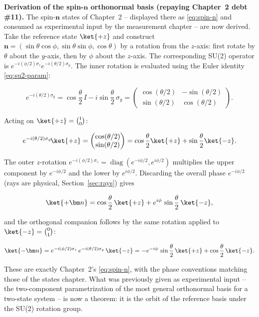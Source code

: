 \medskip\noindent\textbf{Derivation of the spin-$\bm n$ orthonormal basis (repaying Chapter~2 debt \#11).}
The spin-$\bm n$ states of Chapter~2 -- displayed there as \eqref{eq:spin-n} and consumed as experimental input by the measurement chapter -- are now derived. Take the reference state $\ket{+z}$ and construct $\bm n = (\sin\theta\cos\phi,\sin\theta\sin\phi,\cos\theta)$ by a rotation from the $z$-axis: first rotate by $\theta$ about the $y$-axis, then by $\phi$ about the $z$-axis. The corresponding SU(2) operator is $e^{-i(\phi/2)\sigma_z}e^{-i(\theta/2)\sigma_y}$. The inner rotation is evaluated using the Euler identity \eqref{eq:su2-param}:
\begin{linenomath}
  \begin{equation*}
    e^{-i(\theta/2)\sigma_y}
    = \cos\frac{\theta}{2}\,I - i\sin\frac{\theta}{2}\,\sigma_y
    = \begin{pmatrix}
        \cos(\theta/2) & -\sin(\theta/2) \\[2pt]
        \sin(\theta/2) &  \cos(\theta/2)
      \end{pmatrix}.
  \end{equation*}
\end{linenomath}
Acting on $\ket{+z} = \binom{1}{0}$:
\begin{linenomath}
  \begin{equation*}
    e^{-i(\theta/2)\sigma_y}\!\ket{+z}
    = \begin{pmatrix} \cos(\theta/2) \\ \sin(\theta/2) \end{pmatrix}
    = \cos\frac{\theta}{2}\ket{+z} + \sin\frac{\theta}{2}\ket{-z}.
  \end{equation*}
\end{linenomath}
The outer $z$-rotation $e^{-i(\phi/2)\sigma_z} = \operatorname{diag}(e^{-i\phi/2}, e^{i\phi/2})$ multiplies the upper component by $e^{-i\phi/2}$ and the lower by $e^{i\phi/2}$. Discarding the overall phase $e^{-i\phi/2}$ (rays are physical, Section~\ref{sec:rays}) gives
\begin{linenomath}
  \begin{equation}
    \ket{+\bm n} = \cos\frac{\theta}{2}\,\ket{+z} + e^{i\phi}\,\sin\frac{\theta}{2}\,\ket{-z},
    \label{eq:spin-n-derived}
  \end{equation}
\end{linenomath}
and the orthogonal companion follows by the same rotation applied to $\ket{-z}=\binom{0}{1}$:
\begin{linenomath}
  \begin{equation}
    \ket{-\bm n} = e^{-i(\phi/2)\sigma_z}\,e^{-i(\theta/2)\sigma_y}\,\ket{-z}
    = -e^{-i\phi}\,\sin\frac{\theta}{2}\,\ket{+z} + \cos\frac{\theta}{2}\,\ket{-z}.
  \end{equation}
\end{linenomath}
These are exactly Chapter~2's \eqref{eq:spin-n}, with the phase conventions matching those of the states chapter. What was previously given as experimental input -- the two-component parametrization of the most general orthonormal basis for a two-state system -- is now a theorem: it is the orbit of the reference basis under the SU(2) rotation group.


